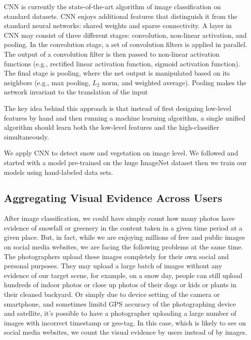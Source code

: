 CNN is currently the state-of-the-art algorithm of image classification on standard datasets.
CNN enjoys additional features that distinguish it from the standard neural networks: 
shared weights and sparse connectivity.
A layer in CNN may consist of three different stages: 
convolution, non-linear activation, and pooling.
In the convolution stage, a set of convolution filters is applied in parallel. 
The output of a convolution filter is then passed to non-linear activation functions 
(e.g., rectified linear activation function, sigmoid activation function).
The final stage is pooling, where the net output is manipulated based on its neighbors 
(e.g., max pooling, $L_2$ norm, and weighted average).
Pooling makes the network invariant to the translation of the input

The key idea behind this approach is that instead of first designing low-level features by
hand and then running a machine learning algorithm, a single unified
algorithm should learn both the low-level features and the
high-classifier simultaneously. 

We apply CNN to detect snow and vegetation on image level. 
We followed  and started with a model pre-trained on the huge 
ImageNet dataset then we train our models using hand-labeled data sets.

\subsection{Aggregating Visual Evidence Across Users}
After image classification, we could have simply count how many photos have evidence of snowfall 
or greenery in the content taken in a given time period at a given place. But, in fact, while we are 
enjoying millions of free and public images on social media websites, we are facing the following problems 
at the same time. The photographers upload these images completely for their own social and personal purposes. 
They may upload a large batch of images without any evidence of our target scene, for example, 
on a snow 
day, people can still upload hundreds of indoor photos or close up photos of their dogs or kids or plants 
in their cleaned backyard. 
Or simply due to device setting of the camera or smartphone, and sometimes limitd GPS accuracy of the photographing 
device and satellite, it's possible 
to have a photographer uploading a large number of images with incorrect timestamp or geo-tag.
In this case, which is likely to see on social media websites, we count the visual evidence 
by users instead of by images.


